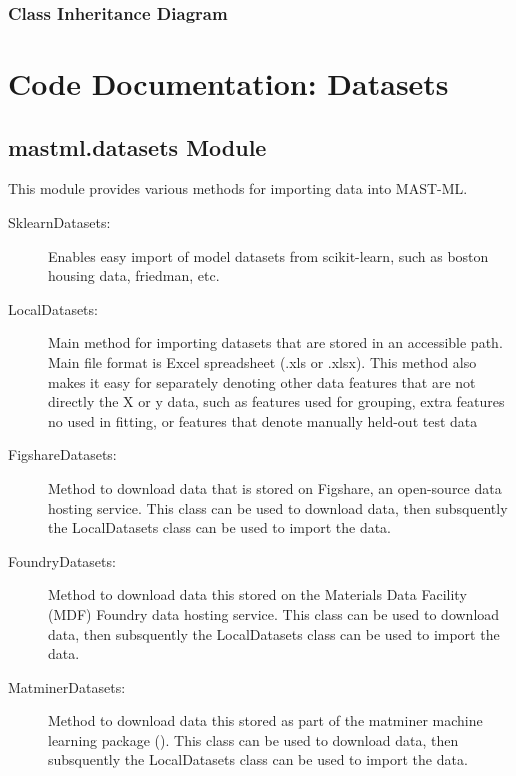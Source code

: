 \documentclass[letterpaper,10pt,english]{sphinxmanual}
\begin{document}
\subsection{Class Inheritance Diagram}
\label{\detokenize{2_data_splitters:class-inheritance-diagram}}


\chapter{Code Documentation: Datasets}
\label{\detokenize{3_datasets:code-documentation-datasets}}\label{\detokenize{3_datasets::doc}}

\section{mastml.datasets Module}
\label{\detokenize{3_datasets:module-mastml.datasets}}\label{\detokenize{3_datasets:mastml-datasets-module}}
This module provides various methods for importing data into MAST-ML.
\begin{description}
\item[{SklearnDatasets:}] \leavevmode
Enables easy import of model datasets from scikit-learn, such as boston housing data, friedman, etc.

\item[{LocalDatasets:}] \leavevmode
Main method for importing datasets that are stored in an accessible path. Main file format is Excel
spreadsheet (.xls or .xlsx). This method also makes it easy for separately denoting other data features
that are not directly the X or y data, such as features used for grouping, extra features no used in
fitting, or features that denote manually held-out test data

\item[{FigshareDatasets:}] \leavevmode
Method to download data that is stored on Figshare, an open-source data hosting service. This class
can be used to download data, then subsquently the LocalDatasets class can be used to import the data.

\item[{FoundryDatasets:}] \leavevmode
Method to download data this stored on the Materials Data Facility (MDF) Foundry data hosting service.
This class can be used to download data, then subsquently the LocalDatasets class can be used to import
the data.

\item[{MatminerDatasets:}] \leavevmode
Method to download data this stored as part of the matminer machine learning package
(). This class can be used to download data, then
subsquently the LocalDatasets class can be used to import the data.

\end{description}
\end{document}
